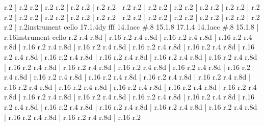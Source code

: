       r.2
    |
      r.2
      r.2
    |
      r.2
      r.2
    |
      r.2
      r.2
    |
      r.2
      r.2
    |
      r.2
      r.2
    |
      r.2
      r.2
    |
      r.2
      r.2
    |
      r.2
      r.2
    |
      r.2
      r.2
    |
      r.2
      r.2
    |
      r.2
      r.2
    |
      r.2
      r.2
    |
      r.2
      r.2
    |
      r.2
      r.2
    |
      r.2
      r.2
    |
      r.2
      r.2
    |
      r.2
      r.2
    |
      r.2
      r.2
    |
      r.2
      r.2
    |
      r.2
      r.2
    |
      r.2{instrument cello}
      17.1.4{dy fff}
      14.1{acc #}.8
      15.1.8
      17.1.4
      14.1{acc #}.8
      15.1.8
    |
      r.16{instrument cello}
      r.2
      r.4
      r.8{d}
    |
      r.16
      r.2
      r.4
      r.8{d}
    |
      r.16
      r.2
      r.4
      r.8{d}
    |
      r.16
      r.2
      r.4
      r.8{d}
    |
      r.16
      r.2
      r.4
      r.8{d}
    |
      r.16
      r.2
      r.4
      r.8{d}
    |
      r.16
      r.2
      r.4
      r.8{d}
    |
      r.16
      r.2
      r.4
      r.8{d}
    |
      r.16
      r.2
      r.4
      r.8{d}
    |
      r.16
      r.2
      r.4
      r.8{d}
    |
      r.16
      r.2
      r.4
      r.8{d}
    |
      r.16
      r.2
      r.4
      r.8{d}
    |
      r.16
      r.2
      r.4
      r.8{d}
    |
      r.16
      r.2
      r.4
      r.8{d}
    |
      r.16
      r.2
      r.4
      r.8{d}
    |
      r.16
      r.2
      r.4
      r.8{d}
    |
      r.16
      r.2
      r.4
      r.8{d}
    |
      r.16
      r.2
      r.4
      r.8{d}
    |
      r.16
      r.2
      r.4
      r.8{d}
    |
      r.16
      r.2
      r.4
      r.8{d}
    |
      r.16
      r.2
      r.4
      r.8{d}
    |
      r.16
      r.2
      r.4
      r.8{d}
    |
      r.16
      r.2
      r.4
      r.8{d}
    |
      r.16
      r.2
      r.4
      r.8{d}
    |
      r.16
      r.2
      r.4
      r.8{d}
    |
      r.16
      r.2
      r.4
      r.8{d}
    |
      r.16
      r.2
      r.4
      r.8{d}
    |
      r.16
      r.2
      r.4
      r.8{d}
    |
      r.16
      r.2
      r.4
      r.8{d}
    |
      r.16
      r.2
      r.4
      r.8{d}
    |
      r.16
      r.2
      r.4
      r.8{d}
    |
      r.16
      r.2
      r.4
      r.8{d}
    |
      r.16
      r.2
      r.4
      r.8{d}
    |
      r.16
      r.2
      r.4
      r.8{d}
    |
      r.16
      r.2
      r.4
      r.8{d}
    |
      r.16
      r.2
      r.4
      r.8{d}
    |
      r.16
      r.2
      r.4
      r.8{d}
    |
      r.16
      r.2
      r.4
      r.8{d}
    |
      r.16
      r.2
